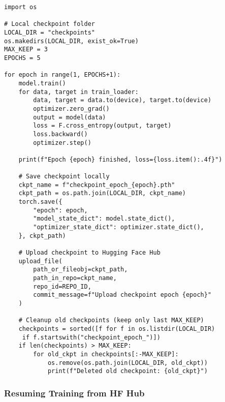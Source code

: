 \begin{tcolorbox}[colback=yellow!5!white, colframe=yellow!75!black, title=Training with Auto-Save]
\begin{verbatim}
import os

# Local checkpoint folder
LOCAL_DIR = "checkpoints"
os.makedirs(LOCAL_DIR, exist_ok=True)
MAX_KEEP = 3
EPOCHS = 5

for epoch in range(1, EPOCHS+1):
    model.train()
    for data, target in train_loader:
        data, target = data.to(device), target.to(device)
        optimizer.zero_grad()
        output = model(data)
        loss = F.cross_entropy(output, target)
        loss.backward()
        optimizer.step()

    print(f"Epoch {epoch} finished, loss={loss.item():.4f}")

    # Save checkpoint locally
    ckpt_name = f"checkpoint_epoch_{epoch}.pth"
    ckpt_path = os.path.join(LOCAL_DIR, ckpt_name)
    torch.save({
        "epoch": epoch,
        "model_state_dict": model.state_dict(),
        "optimizer_state_dict": optimizer.state_dict(),
    }, ckpt_path)

    # Upload checkpoint to Hugging Face Hub
    upload_file(
        path_or_fileobj=ckpt_path,
        path_in_repo=ckpt_name,
        repo_id=REPO_ID,
        commit_message=f"Upload checkpoint epoch {epoch}"
    )

    # Cleanup old checkpoints (keep only last MAX_KEEP)
    checkpoints = sorted([f for f in os.listdir(LOCAL_DIR)
     if f.startswith("checkpoint_epoch_")])
    if len(checkpoints) > MAX_KEEP:
        for old_ckpt in checkpoints[:-MAX_KEEP]:
            os.remove(os.path.join(LOCAL_DIR, old_ckpt))
            print(f"Deleted old checkpoint: {old_ckpt}")
\end{verbatim}
\end{tcolorbox}



\subsubsection{Resuming Training from HF Hub}

